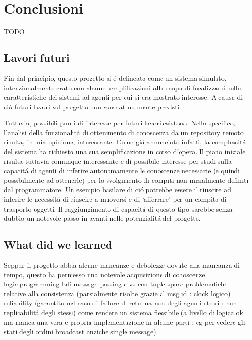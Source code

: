 \section{Conclusioni}
TODO

\subsection{Lavori futuri}

Fin dal principio, questo progetto si \'e delineato come un sistema simulato, intenzionalmente crato con alcune semplificazioni allo scopo di focalizzarsi sulle caratteristiche dei sistemi ad agenti per cui si era mostrato interesse. A causa di ci\'o futuri lavori sul progetto non sono attualmente previsti.

\parag
Tuttavia, possibili punti di interesse per futuri lavori esistono. Nello specifico, l'analisi della funzionalit\'a di ottenimento di conoscenza da un repository remoto risulta, in mia opinione, interessante. Come gi\'a annunciato infatti, la complessit\'a del sistema ha richiesto una sua semplificazione in corso d'opera. Il piano iniziale risulta tuttavia comunque interessante e di possibile interesse per studi sulla capacit\'a di agenti di inferire autonomamente le conoscenze necessarie (e quindi possibilmente ad ottenerle) per lo svolgimento di compiti non inizialmente definiti dal programmatore. Un esempio basilare di ci\'o potrebbe essere il riuscire ad inferire le necessit\'a di riuscire a muoversi e di `afferrare' per un compito di trasporto oggetti. Il raggiungimento di capacit\'a di questo tipo sarebbe senza dubbio un notevole passo in avanti nelle potenzialit\'a del progetto.

\subsection{What did we learned}

Seppur il progetto abbia alcune mancanze e debolezze dovute alla mancanza di tempo, questo ha permesso una notevole acquisizione di conoscenze.\\
logic programming
bdi
message passing e vs con tuple space
problematiche relative alla consistenza (parzialmente risolte grazie al msg id : clock logico)
reliability (garantita nel caso di failure di rete ma non degli agenti stessi : non replicabilit\'a degli stessi)
come rendere un sistema flessibile (a livello di logica ok ma manca una vera e propria implementazione in alcune parti : eg per vedere gli stati degli ordini broadcast anziche single message)

